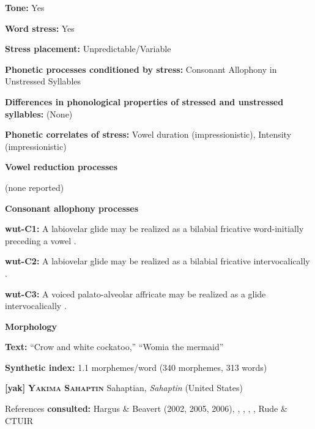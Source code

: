 \textbf{Tone:} Yes



\textbf{Word stress:} Yes



\textbf{Stress placement:} Unpredictable/Variable



\textbf{Phonetic processes conditioned by stress:} Consonant Allophony in Unstressed Syllables



\textbf{Differences in phonological properties of stressed and unstressed syllables:} (None)



\textbf{Phonetic correlates of stress:} Vowel duration (impressionistic), Intensity (impressionistic)



\textbf{Vowel reduction processes}



(none reported)



\textbf{Consonant allophony processes}



\textbf{wut-C1:} A labiovelar glide may be realized as a bilabial fricative word-initially preceding a vowel \citep[57-8]{Marmion2010}.



\textbf{wut-C2:} A labiovelar glide may be realized as a bilabial fricative intervocalically \citep[57-8]{Marmion2010}.



\textbf{wut-C3:} A voiced palato-alveolar affricate may be realized as a glide intervocalically \citep[55]{Marmion2010}.



\textbf{Morphology}



\textbf{Text:} “Crow and white cockatoo,” “Womia the mermaid” \citep[378-382]{Marmion2010}



\textbf{Synthetic index:} 1.1 morphemes/word (340 morphemes, 313 words)



\textbf{[yak]}   \textbf{\textsc{Yakima Sahaptin}}  Sahaptian, \textit{Sahaptin} (United States)



References \textbf{consulted:} Hargus \& Beavert (2002, 2005, 2006), \citet{Jansen2010}, \citet{Minthorn2005}, \citet{RigsbyRude1996}, \citet{Rude2009}, Rude \& CTUIR 



